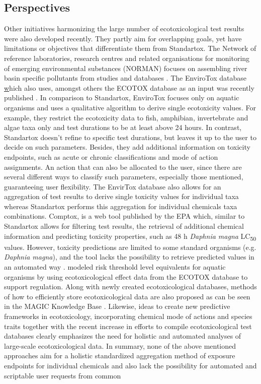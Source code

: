 \subsection{Perspectives}
Other initiatives harmonizing the large number of ecotoxicological test results were also developed recently. They partly aim for overlapping goals, yet have limitations or objectives that differentiate them from Standartox. The Network of reference laboratories, research centres and related organisations for monitoring of emerging environmental substances (NORMAN) focuses on assembling river basin specific pollutants from studies and databases \citep{von_der_ohe_new_2011}. The EnviroTox database \href{https://envirotoxdatabase.org/} which also uses, amongst others the ECOTOX database as an input was recently published \citep{healthandenvironmentalsciencesinstitutehesi_envirotox_2019, connors_creation_2019}. In comparison to Standartox, EnviroTox focuses only on aquatic organisms and uses a qualitative algorithm to derive single ecotoxicity values. For example, they restrict the ecotoxicity data to fish, amphibian, invertebrate and algae taxa only and test durations to be at least above 24 hours. In contrast, Standartox doesn't refine to specific test durations, but leaves it up to the user to decide on such parameters. Besides, they add additional information on toxicity endpoints, such as acute or chronic classifications and mode of action assignments. An action that can also be allocated to the user, since there are several different ways to classify such parameters, especially those mentioned, guaranteeing user flexibility. The EnvirTox database also allows for an aggregation of test results to derive single toxicity values for individual taxa whereas Standartox performs this aggregation for individual chemicals taxa combinations. Comptox, is a web tool published by the EPA which, similar to Standartox allows for filtering test results, the retrieval of additional chemical information and predicting toxicity properties, such as 48 h \textit{Daphnia magna} LC\textsubscript{50} values. However, toxicity predictions are limited to some standard organisms (e.g. \textit{Daphnia magna}), and the tool lacks the possibility to retrieve predicted values in an automated way \citep{williams_comptox_2017}. \citet{petschick_modeling_2019} modeled risk threshold level equivalents for aquatic organisms by using ecotoxicological effect data from the ECOTOX database to support regulation. Along with newly created ecotoxicological databases, methods of how to efficiently store ecotoxicological data are also proposed as can be seen in the MAGIC Knowledge Base \citep{bub_graphing_2019}. Likewise, ideas to create new predictive frameworks in ecotoxicology, incorporating chemical mode of actions and species traits \citep{vandenberg_modeling_2019} together with the recent increase in efforts to compile ecotoxicological test databases clearly emphasizes the need for holistic and automated analyses of large-scale ecotoxicological data. In summary, none of the above mentioned approaches aim for a holistic standardized aggregation method of exposure endpoints for individual chemicals and also lack the possibility for automated and scriptable user requests from common 